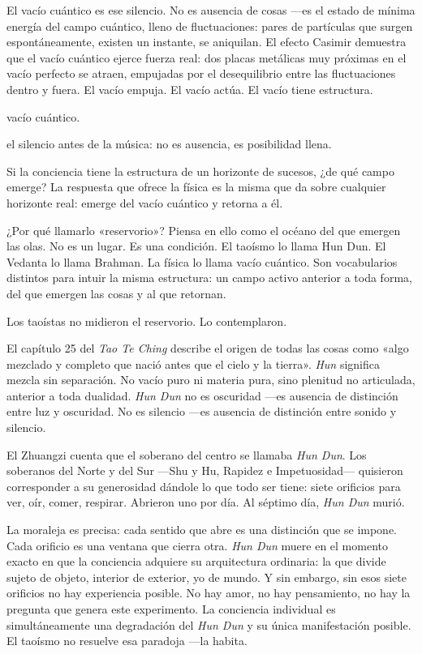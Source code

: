 El vacío cuántico es ese silencio. No es ausencia de cosas —es el estado de mínima energía del campo cuántico, lleno de fluctuaciones: pares de partículas que surgen espontáneamente, existen un instante, se aniquilan. El efecto Casimir demuestra que el vacío cuántico ejerce fuerza real: dos placas metálicas muy próximas en el vacío perfecto se atraen, empujadas por el desequilibrio entre las fluctuaciones dentro y fuera. El vacío empuja. El vacío actúa. El vacío tiene estructura.

\begin{fisica}
 vacío cuántico.

 el silencio antes de la música: no es ausencia, es posibilidad llena.
\end{fisica}
Si la conciencia tiene la estructura de un horizonte de sucesos, ¿de qué campo emerge? La respuesta que ofrece la física es la misma que da sobre cualquier horizonte real: emerge del vacío cuántico y retorna a él.

\begin{cajalateral}{¿Por qué llamarlo «reservorio»?}
Piensa en ello como el océano del que emergen las olas. No es un lugar. Es una condición. El taoísmo lo llama Hun Dun. El Vedanta lo llama Brahman. La física lo llama vacío cuántico. Son vocabularios distintos para intuir la misma estructura: un campo activo anterior a toda forma, del que emergen las cosas y al que retornan.
\end{cajalateral}
\noindent Los taoístas no midieron el reservorio. Lo contemplaron.

El capítulo 25 del \emph{Tao Te Ching} describe el origen de todas las cosas como «algo mezclado y completo que nació antes que el cielo y la tierra». \emph{Hun} significa mezcla sin separación. No vacío puro ni materia pura, sino plenitud no articulada, anterior a toda dualidad. \emph{Hun Dun} no es oscuridad —es ausencia de distinción entre luz y oscuridad. No es silencio —es ausencia de distinción entre sonido y silencio.

El Zhuangzi cuenta que el soberano del centro se llamaba \emph{Hun Dun}. Los soberanos del Norte y del Sur —Shu y Hu, Rapidez e Impetuosidad— quisieron corresponder a su generosidad dándole lo que todo ser tiene: siete orificios para ver, oír, comer, respirar. Abrieron uno por día. Al séptimo día, \emph{Hun Dun} murió.

La moraleja es precisa: cada sentido que abre es una distinción que se impone. Cada orificio es una ventana que cierra otra. \emph{Hun Dun} muere en el momento exacto en que la conciencia adquiere su arquitectura ordinaria: la que divide sujeto de objeto, interior de exterior, yo de mundo. Y sin embargo, sin esos siete orificios no hay experiencia posible. No hay amor, no hay pensamiento, no hay la pregunta que genera este experimento. La conciencia individual es simultáneamente una degradación del \emph{Hun Dun} y su única manifestación posible. El taoísmo no resuelve esa paradoja —la habita.

